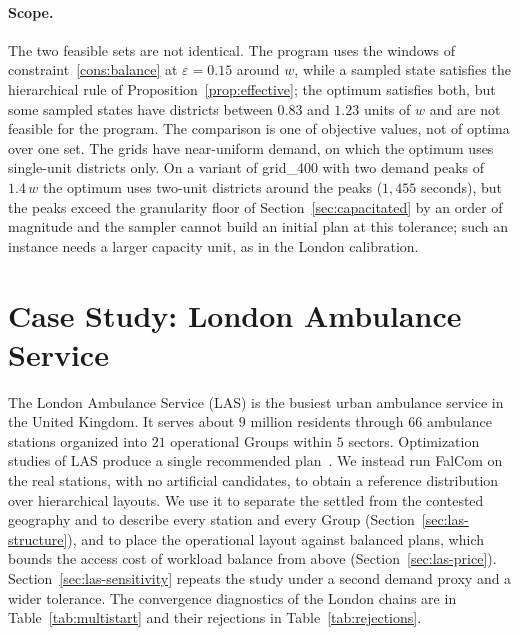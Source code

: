 \documentclass[11pt]{article}
\theoremstyle{definition}
\begin{document}
\paragraph{Scope.}
The two feasible sets are not identical. The program uses the windows of constraint~\eqref{cons:balance} at $\varepsilon = 0.15$ around $w$, while a sampled state satisfies the hierarchical rule of Proposition~\ref{prop:effective}; the optimum satisfies both, but some sampled states have districts between $0.83$ and $1.23$ units of $w$ and are not feasible for the program. The comparison is one of objective values, not of optima over one set. The grids have near-uniform demand, on which the optimum uses single-unit districts only. On a variant of grid\_400 with two demand peaks of $1.4\,w$ the optimum uses two-unit districts around the peaks ($1{,}455$ seconds), but the peaks exceed the granularity floor of Section~\ref{sec:capacitated} by an order of magnitude and the sampler cannot build an initial plan at this tolerance; such an instance needs a larger capacity unit, as in the London calibration.

\section{Case Study: London Ambulance Service}
\label{sec:exp-emergency}

The London Ambulance Service (LAS) is the busiest urban ambulance service in the United Kingdom. It serves about $9$ million residents through $66$ ambulance stations organized into $21$ operational Groups within $5$ sectors. Optimization studies of LAS produce a single recommended plan~\citep{mccormack2015simulation}. We instead run FalCom on the real stations, with no artificial candidates, to obtain a reference distribution over hierarchical layouts. We use it to separate the settled from the contested geography and to describe every station and every Group (Section~\ref{sec:las-structure}), and to place the operational layout against balanced plans, which bounds the access cost of workload balance from above (Section~\ref{sec:las-price}). Section~\ref{sec:las-sensitivity} repeats the study under a second demand proxy and a wider tolerance. The convergence diagnostics of the London chains are in Table~\ref{tab:multistart} and their rejections in Table~\ref{tab:rejections}.

\end{document}
